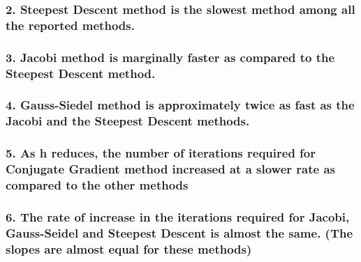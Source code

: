 \documentclass[11pt]{article}
\begin{document}
    \hypertarget{steepest-descent-method-is-the-slowest-method-among-all-the-reported-methods.}{%
\subsubsection{2. Steepest Descent method is the slowest method among
all the reported
methods.}\label{steepest-descent-method-is-the-slowest-method-among-all-the-reported-methods.}}

    \hypertarget{jacobi-method-is-marginally-faster-as-compared-to-the-steepest-descent-method.}{%
\subsubsection{3. Jacobi method is marginally faster as compared to the
Steepest Descent
method.}\label{jacobi-method-is-marginally-faster-as-compared-to-the-steepest-descent-method.}}

    \hypertarget{gauss-siedel-method-is-approximately-twice-as-fast-as-the-jacobi-and-the-steepest-descent-methods.}{%
\subsubsection{4. Gauss-Siedel method is approximately twice as fast as
the Jacobi and the Steepest Descent
methods.}\label{gauss-siedel-method-is-approximately-twice-as-fast-as-the-jacobi-and-the-steepest-descent-methods.}}

    \hypertarget{as-h-reduces-the-number-of-iterations-required-for-conjugate-gradient-method-increased-at-a-slower-rate-as-compared-to-the-other-methods}{%
\subsubsection{5. As h reduces, the number of iterations required for
Conjugate Gradient method increased at a slower rate as compared to the
other
methods}\label{as-h-reduces-the-number-of-iterations-required-for-conjugate-gradient-method-increased-at-a-slower-rate-as-compared-to-the-other-methods}}

    \hypertarget{the-rate-of-increase-in-the-iterations-required-for-jacobi-gauss-seidel-and-steepest-descent-is-almost-the-same.-the-slopes-are-almost-equal-for-these-methods}{%
\subsubsection{6. The rate of increase in the iterations required for
Jacobi, Gauss-Seidel and Steepest Descent is almost the same. (The
slopes are almost equal for these
methods)}\label{the-rate-of-increase-in-the-iterations-required-for-jacobi-gauss-seidel-and-steepest-descent-is-almost-the-same.-the-slopes-are-almost-equal-for-these-methods}}


    
    
    
\end{document}
